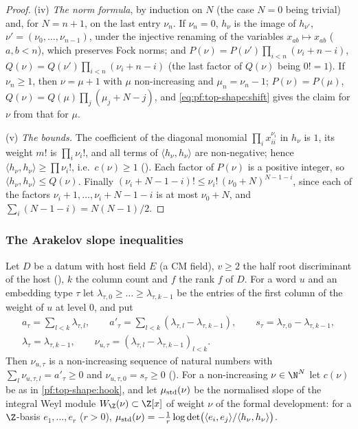 \begin{proof}
(iv) \emph{The norm formula}, by induction on $N$ (the case $N=0$ being trivial) and, for $N=n+1$, on the last entry
$\nu_n$. If $\nu_n=0$, $h_\nu$ is the image of $h_{\nu'}$, $\nu'=(\nu_0,\dots,\nu_{n-1})$, under the injective renaming of
the variables $x_{ab}\mapsto x_{ab}$ ($a,b<n$), which preserves Fock norms; and $P(\nu)=P(\nu')\prod_{i<n}(\nu_i+n-i)$,
$Q(\nu)=Q(\nu')\prod_{i<n}(\nu_i+n-i)$ (the last factor of $Q(\nu)$ being $0!=1$). If $\nu_n\ge1$, then $\nu=\mu+1$ with $\mu$
non-increasing and $\mu_n=\nu_n-1$; $P(\nu)=P(\mu)$, $Q(\nu)=Q(\mu)\prod_j(\mu_j+N-j)$, and \eqref{eq:pf:top-shape:shift}
gives the claim for $\nu$ from that for $\mu$.

(v) \emph{The bounds.} The coefficient of the diagonal monomial $\prod_ix_{ii}^{\nu_i}$ in $h_\nu$ is $1$, its weight $m!$
is $\prod_i\nu_i!$, and all terms of $\langle h_\nu,h_\nu\rangle$ are non-negative; hence $\langle h_\nu,h_\nu\rangle\ge\prod\nu_i!$,
i.e.\ $c(\nu)\ge1$ (). Each factor of $P(\nu)$ is a positive integer, so
$\langle h_\nu,h_\nu\rangle\le Q(\nu)$. Finally $(\nu_i+N-1-i)!\le\nu_i!\,(\nu_0+N)^{N-1-i}$, since each of the factors
$\nu_i+1,\dots,\nu_i+N-1-i$ is at most $\nu_0+N$, and $\sum_i(N-1-i)=N(N-1)/2$.
\end{proof}

\subsubsection*{The Arakelov slope inequalities}

Let $D$ be a datum with host field $E$ (a CM field), $v\ge2$ the half root discriminant of the host
(), $k$ the column count and $f$ the rank $f$ of
$D$. For a word $u$ and an embedding type $\tau$ let $\lambda_{\tau,0}\ge\dots\ge\lambda_{\tau,k-1}$ be the entries of the
first column of the weight of $u$ at level $0$, and put
\begin{gather*}
a_\tau=\sum_{l<k}\lambda_{\tau,l},\qquad a'_\tau=\sum_{l<k}(\lambda_{\tau,l}-\lambda_{\tau,k-1}),\qquad
s_\tau=\lambda_{\tau,0}-\lambda_{\tau,k-1},\\
\lambda_\tau=\lambda_{\tau,k-1},\qquad\nu_{u,\tau}=(\lambda_{\tau,l}-\lambda_{\tau,k-1})_{l<k}.
\end{gather*}
Then $\nu_{u,\tau}$ is a non-increasing sequence of natural numbers with $\sum_l\nu_{u,\tau,l}=a'_\tau\ge0$ and
$\nu_{u,\tau,0}=s_\tau\ge0$ (). For a
non-increasing $\nu\in\N^N$ let $c(\nu)$ be as in \cref{pf:top-shape:hook}, and let $\mu_{\rm std}(\nu)$ be the normalised
slope of the integral Weyl module $W_\Z(\nu)\subset\Z[x]$ of weight $\nu$ of the formal development: for a $\Z$-basis
$e_1,\dots,e_r$ ($r>0$), $\mu_{\rm std}(\nu)=-\frac1r\log\det\bigl(\langle e_i,e_j\rangle/\langle h_\nu,h_\nu\rangle\bigr)$.

